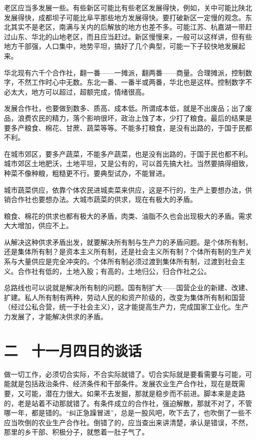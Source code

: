 老区应当多发展一些。有些新区可能比有些老区发展得快，例如，关中可能比陕北发展得快，成都坝子可能比阜平那些地方发展得快。要打破新区一定慢的观念。东北其实不是老区，南满与关内的后解放的地方也差不多。可能江苏、杭嘉湖一带赶过山东、华北的山地老区，而且应当赶过。新区慢慢来，一般可以这样讲，但有些地方干部强，人口集中，地势平坦，搞好了几个典型，可能一下子较快地发展起来。

华北现有六千个合作社，翻一番——一摊派，翻两番——商量。合理摊派，控制数字，不然工作时心中无数。东北一番、一番半或两番，华北也是这样。控制数字不必太大，地方可以超过，超额完成，情绪很高。

发展合作社，也要做到数多、质高、成本低。所谓成本低，就是不出废品；出了废品，浪费农民的精力，落个影响很坏，政治上蚀了本，少打了粮食。最后的结果是要多产粮食、棉花、甘蔗、蔬菜等等。不能多打粮食，是没有出路的，于国于民都不利。

在城市郊区，要多产蔬菜，不能多产蔬菜，也是没有出路的，于国于民也都不利。城市郊区土地肥沃，土地平坦，又是公有的，可以首先搞大社。当然要搞得细致，种菜不像种粮，粗糙更不行。要典型试办，不能冒进。

城市蔬菜供应，依靠个体农民进城卖菜来供应，这是不行的，生产上要想办法，供销合作社也要想办法。大城市蔬菜的供求，现在有极大的矛盾。

粮食、棉花的供求也都有极大的矛盾，肉类、油脂不久也会出现极大的矛盾。需求大大增加，供应不上。

从解决这种供求矛盾出发，就要解决所有制与生产力的矛盾问题。是个体所有制，还是集体所有制？是资本主义所有制，还是社会主义所有制？个体所有制的生产关系与大量供应是完全冲突的。个体所有制必须过渡到集体所有制，过渡到社会主义。合作社有低的，土地入股；有高的，土地归公，归合作社之公。

总路线也可以说就是解决所有制的问题。国有制扩大——国营企业的新建、改建、扩建。私人所有制有两种，劳动人民的和资产阶级的，改变为集体所有制和国营（经过公私合营，统一于社会主义），这才能提高生产力，完成国家工业化。生产力发展了，才能解决供求的矛盾。

\section{二　十一月四日的谈话}

做一切工作，必须切合实际，不合实际就错了。切合实际就是要看需要与可能，可能就是包括政治条件、经济条件和干部条件。发展农业生产合作社，现在是既需要，又可能，潜在力很大。如果不去发掘，那就是稳步而不前进。脚本来是走路的，老是站着不动那就错了。有条件成立的合作社，强迫解散，那就不对了，不管哪一年，都是错的。“纠正急躁冒进”，总是一股风吧，吹下去了，也吹倒了一些不应当吹倒的农业生产合作社。倒错了的，应当查出来讲清楚，承认是错误，不然，那里的乡干部、积极分子，就憋着一肚子气了。


